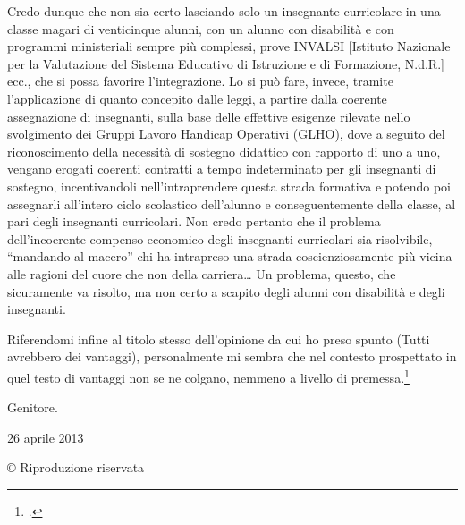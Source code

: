 Credo dunque che non sia certo lasciando solo un insegnante curricolare in una classe magari di venticinque alunni, con un alunno con disabilità e con programmi ministeriali sempre più complessi, prove INVALSI [Istituto Nazionale per la Valutazione del Sistema Educativo di Istruzione e di Formazione, N.d.R.] ecc., che si possa favorire l'integrazione. Lo si può fare, invece, tramite l'applicazione di quanto concepito dalle leggi, a partire dalla coerente assegnazione di insegnanti, sulla base delle effettive esigenze rilevate nello svolgimento dei Gruppi Lavoro Handicap Operativi (GLHO), dove a seguito del riconoscimento della necessità di sostegno didattico con rapporto di uno a uno, vengano erogati coerenti contratti a tempo indeterminato per gli insegnanti di sostegno, incentivandoli nell'intraprendere questa strada formativa e potendo poi assegnarli all'intero ciclo scolastico dell'alunno e conseguentemente della classe, al pari degli insegnanti curricolari.
Non credo pertanto che il problema dell'incoerente compenso economico degli insegnanti curricolari sia risolvibile, “mandando al macero” chi ha intrapreso una strada coscienziosamente più vicina alle ragioni del cuore che non della carriera… Un problema, questo, che sicuramente va risolto, ma non certo a scapito degli alunni con disabilità e degli insegnanti.

Riferendomi infine al titolo stesso dell'opinione da cui ho preso spunto (Tutti avrebbero dei vantaggi), personalmente mi sembra che nel contesto prospettato in quel testo di vantaggi non se ne colgano, nemmeno a livello di premessa.\footcite{Brogi2013a}

Genitore.

26 aprile 2013

© Riproduzione riservata
